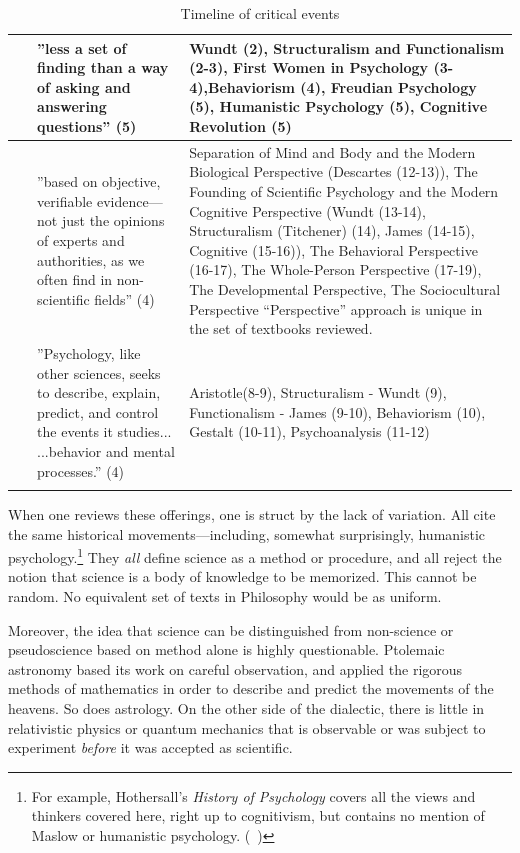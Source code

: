 \begin{refsection}
\begin{longtable}[!t]{ | P{2cm} | P{5cm} | P{7cm} | }
~\citep{Myers:2015ws}&”less a set of finding than a way of asking and answering questions” (5)&Wundt (2), Structuralism and Functionalism (2-3), First Women in Psychology (3-4),Behaviorism (4), Freudian Psychology (5), Humanistic Psychology (5), Cognitive Revolution (5) \\ \hline
~\citep{Zimbardo:2012uz}&”based on objective, verifiable evidence---not just the opinions of experts and authorities, as we often find in non-scientific fields” (4) &Separation of Mind and Body and the Modern Biological Perspective (Descartes (12-13)), The Founding of Scientific Psychology and the Modern Cognitive Perspective (Wundt (13-14), Structuralism (Titchener) (14), James (14-15), Cognitive (15-16)), The Behavioral Perspective (16-17), The Whole-Person Perspective (17-19), The Developmental Perspective, The Sociocultural Perspective \newline “Perspective” approach is unique in the set of textbooks reviewed.\\ \hline
~\citep{Rathus:2012uz}&”Psychology, like other sciences, seeks to describe, explain, predict, and control the events it studies... ...behavior and mental processes.” (4)& Aristotle(8-9), Structuralism - Wundt (9), Functionalism - James (9-10), Behaviorism (10), Gestalt (10-11), Psychoanalysis (11-12) \\ \hline
\caption{Timeline of critical events}
\label{table: timeline}
\end{longtable}

When one reviews these offerings, one is struct by the lack of variation. All cite the same historical movements---including, somewhat surprisingly, humanistic psychology.\footnote{For example, Hothersall’s \emph{History of Psychology} covers all the views and thinkers covered here, right up to cognitivism, but contains no mention of Maslow or humanistic psychology. (~\citep{Hothersall:1984te})} They \emph{all} define science as a method or procedure, and all reject the notion that science is a body of knowledge to be memorized. This cannot be random. No equivalent set of texts in Philosophy would be as uniform.

Moreover, the idea that science can be distinguished from non-science or pseudoscience based on method alone is highly questionable. Ptolemaic astronomy based its work on careful observation, and applied the rigorous methods of mathematics in order to describe and predict the movements of the heavens. So does astrology. On the other side of the dialectic, there is little in relativistic physics or quantum mechanics that is observable or was subject to experiment \emph{before} it was accepted as scientific. 


\end{refsection}
